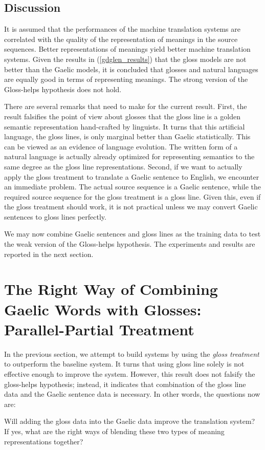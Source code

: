 \documentclass[a4paper]{article}
\begin{document}
\subsection{Discussion}
It is assumed that the performances of the machine translation systems are correlated with the quality of the representation of meanings in the source sequences. 
Better representations of meanings yield better machine translation systems. Given the results in (\ref{gdglen_results}) that the gloss models are not better than the Gaelic models, it is concluded that glosses and natural languages are equally good in terms of representing meanings. The strong version of the Gloss-helps hypothesis does not hold.

There are several remarks that need to make for the current result. First, the result falsifies the point of view about glosses that the gloss line is a golden semantic representation hand-crafted by linguists.
It turns that this artificial language, the gloss lines, is only marginal better than Gaelic statistically. This can be viewed as an evidence of language evolution.
The written form of a natural language is actually already optimized for representing semantics to the same degree as the gloss line representations.
Second, if we want to actually apply the gloss treatment to translate a Gaelic sentence to English, we encounter an immediate problem. The actual source sequence is a Gaelic sentence, while the required source sequence for the gloss treatment is a gloss line. Given this, even if the gloss treatment should work, it is not practical unless we may convert Gaelic sentences to gloss lines perfectly.      

We may now combine Gaelic sentences and gloss lines as the training data to test the weak version of the Gloss-helps hypothesis. The experiments and results are reported in the next section.
\section{The Right Way of Combining Gaelic Words with Glosses: Parallel-Partial Treatment}\label{gd_plus_gl_to_en}
In the previous section, we attempt to build systems by using the \textit{gloss treatment} to outperform the baseline system. It turns that using gloss line solely is not effective enough to improve the system. However, this result does not falsify the gloss-helps hypothesis; instead, it indicates that combination of the gloss line data and the Gaelic sentence data is necessary. In other words, the questions now are: 
\begin{exe}
	\ex 
	\begin{xlist}
		\ex Will adding the gloss data into the Gaelic data improve the translation system? 
		\ex If yes, what are the right ways of blending these two types of meaning representations together? 
	\end{xlist}	
\end{exe}
\end{document}

